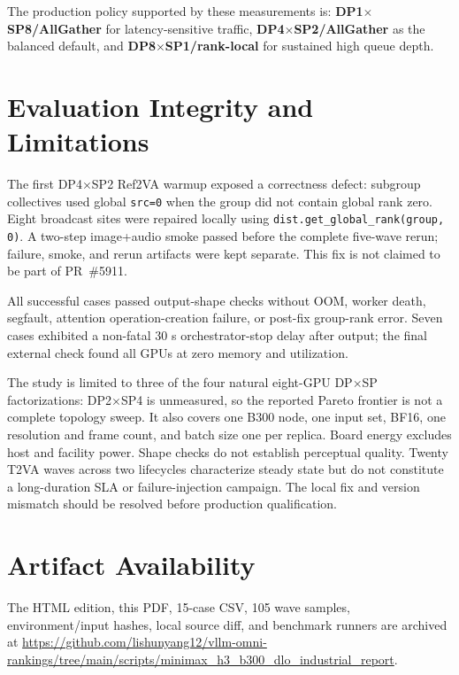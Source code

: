 \documentclass[10pt]{article}
\begin{document}
The production policy supported by these measurements is:
\textbf{DP1$\times$SP8/AllGather} for latency-sensitive traffic,
\textbf{DP4$\times$SP2/AllGather} as the balanced default, and
\textbf{DP8$\times$SP1/rank-local} for sustained high queue depth.

\section{Evaluation Integrity and Limitations}

The first DP4$\times$SP2 Ref2VA warmup exposed a correctness defect:
subgroup collectives used global \texttt{src=0} when the group did not contain
global rank zero.  Eight broadcast sites were repaired locally using
\texttt{dist.get\_global\_rank(group, 0)}.  A two-step image+audio smoke
passed before the complete five-wave rerun; failure, smoke, and rerun artifacts
were kept separate.  This fix is not claimed to be part of PR~\#5911.

All successful cases passed output-shape checks without OOM, worker death,
segfault, attention operation-creation failure, or post-fix group-rank error.
Seven cases exhibited a non-fatal 30 s orchestrator-stop delay after output;
the final external check found all GPUs at zero memory and utilization.

The study is limited to three of the four natural eight-GPU DP$\times$SP
factorizations: DP2$\times$SP4 is unmeasured, so the reported Pareto frontier is
not a complete topology sweep.  It also covers one B300 node, one input set,
BF16, one resolution and frame count, and batch size one per replica.  Board energy excludes host and
facility power.  Shape checks do not establish perceptual quality.  Twenty
T2VA waves across two lifecycles characterize steady state but do not
constitute a long-duration SLA or failure-injection campaign.  The local fix
and version mismatch should be resolved before production qualification.

\section{Artifact Availability}

The HTML edition, this PDF, 15-case CSV, 105 wave samples, environment/input
hashes, local source diff, and benchmark runners are archived at
\url{https://github.com/lishunyang12/vllm-omni-rankings/tree/main/scripts/minimax_h3_b300_dlo_industrial_report}.
\end{document}
